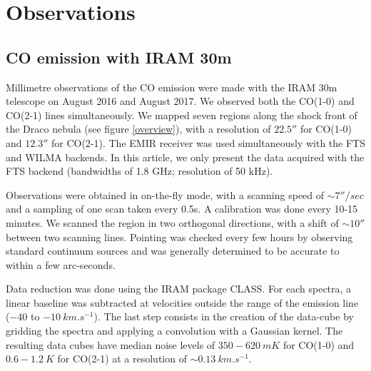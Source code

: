 \documentclass[traditabstract]{aa}
\begin{document}
%




\section{Observations}
\label{sec:Obs}

   \subsection{CO emission with IRAM 30m}

   Millimetre observations of the CO emission were made with the IRAM 30m telescope on August 2016 and August 2017. We observed both the CO(1-0) and CO(2-1) lines simultaneously. We mapped seven regions along the shock front of the Draco nebula (see figure \ref{overview}), with a resolution of $22.5''$ for CO(1-0) and $12.3''$ for CO(2-1). The EMIR receiver was used simultaneously with the FTS and WILMA backends. In this article, we only present the data acquired with the FTS backend (bandwidths of 1.8 GHz; resolution of 50 kHz).

   Observations were obtained in on-the-fly mode, with a scanning speed of $\sim 7''/sec$ and a sampling of one scan taken every 0.5s. A calibration was done every 10-15 minutes. We scanned the region in two orthogonal directions, with a shift of $\sim 10''$ between two scanning lines. Pointing was checked every few hours by observing standard continuum sources and was generally determined to be accurate to within a few arc-seconds.

Data reduction was done using the IRAM package CLASS. For each spectra, a linear baseline was subtracted at velocities outside the range of the emission line ($-40$ to $-10\: km.s^{-1}$). The last step consists in the creation of the data-cube by gridding the spectra and applying a convolution with a Gaussian kernel. The resulting data cubes have median noise levels of $350-620\: mK$ for CO(1-0) and $0.6-1.2\: K$ for CO(2-1) at a resolution of $\sim 0.13\: km.s^{-1}$.

\end{document}
